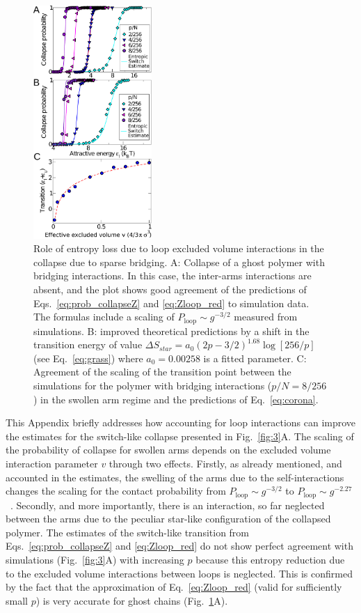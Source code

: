 \documentclass[
preprint,
a4paper,
12pt,
superscriptaddress,
pre]{revtex4}
\begin{document}
\begin{figure}
  \centering
  \includegraphics[width=0.4\textwidth]{fig6}
  \caption{Role of entropy loss due to loop excluded volume
    interactions in the collapse due to sparse bridging. A: Collapse
    of a ghost polymer with bridging interactions. In this case, the
    inter-arms interactions are absent, and the plot shows good
    agreement of the predictions of Eqs.~\ref{eq:prob_collapseZ} and
    \ref{eq:Zloop_red} to simulation data. The formulas include a
    scaling of $P_\mathrm{loop} \sim g^{-3/2}$ measured from
    simulations. B: improved theoretical predictions by a shift in the
    transition energy of value $\Delta S_{star} = a_0 (2p -
    3/2)^{1.68} \log[256/p]$ (see Eq.~\ref{eq:grass}) where $ a_0 =
    0.00258$ is a fitted parameter. C: Agreement of the scaling of the
    transition point between the simulations for the polymer with
    bridging interactions ($p/N = 8/256$) in the swollen arm regime
    and the predictions of Eq.~\ref{eq:corona}.}
  \label{fig:6}
\end{figure}

This Appendix briefly addresses how accounting for loop interactions
can improve the estimates for the switch-like collapse presented in
Fig.~\ref{fig:3}A.  The scaling of the probability of collapse for
swollen arms depends on the excluded volume interaction parameter $v$
through two effects.  Firstly, as already mentioned, and accounted in
the estimates, the swelling of the arms due to the self-interactions
changes the scaling for the contact probability from $P_\mathrm{loop}
\sim g^{-3/2}$ to $P_\mathrm{loop} \sim
g^{-2.27}$~\cite{Marenduzzo2006c}.  Secondly, and more importantly,
there is an interaction, so far neglected between the arms due to the
peculiar star-like configuration of the collapsed polymer.
The estimates of the switch-like transition from
Eqs.~\ref{eq:prob_collapseZ} and \ref{eq:Zloop_red} do not show
perfect agreement with simulations (Fig.~\ref{fig:3}A) with increasing
$p$ because this entropy reduction due to the excluded volume
interactions between loops is neglected. This is confirmed by the fact
that the approximation of Eq.~\ref{eq:Zloop_red} (valid for
sufficiently small $p$) is very accurate for ghost chains
(Fig.~\ref{fig:6}A).
\end{document}
